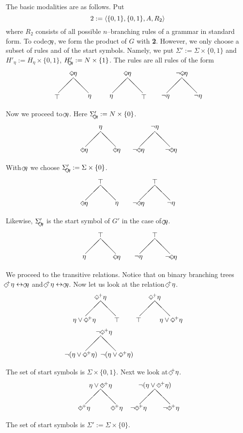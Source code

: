 The basic modalities are as follows. Put
\begin{equation}
\boldmath{2} := \langle \{0,1\}, \{0,1\}, A, R_2\rangle
\end{equation}
where $R_2$ consists of all possible $n$--branching rules of a 
grammar in standard form. To code $\unten \eta$, we form the 
product of $G$ with \textbf{2}. However, we only choose a subset 
of rules and of the start symbols. Namely, we put $\Sigma' := 
\Sigma \times \{0,1\}$ and $H'_{\eta} := H_{\eta} \times \{0,1\}$, 
$H'_{\unten \eta} := N \times \{1\}$. The rules are all rules 
of the form
\begin{equation}
\begin{array}{l}
\binbaum{\unten \eta}{\top}{\eta}
\binbaum{\unten \eta}{\eta}{\top}
\binbaum{\nicht\unten \eta}{\nicht\eta}{\nicht\eta}
\end{array}
\end{equation}
Now we proceed to $\oben\eta$. Here $\Sigma'_{\oben\eta}
:= N \times \{0\}$.
\begin{equation}
\begin{array}{l}
\binbaum{\eta}{\oben \eta}{\oben \eta}
\binbaum{\nicht\eta}{\nicht\oben\eta}{\nicht\oben\eta}
\end{array}
\end{equation}
With $\rechts\eta$ we choose $\Sigma'_{\rechts\eta} := \Sigma \times
\{0\}$.
\begin{equation}
\begin{array}{l}
\binbaum{\top}{\rechts\eta}{\eta}
\binbaum{\top}{\nicht\rechts \eta}{\nicht \eta}
\end{array}
\end{equation}
Likewise, $\Sigma'_{\links\eta}$ is the start symbol of
$G'$ in the case of $\links\eta$.
\begin{equation}
\begin{array}{l}
\binbaum{\top}{\eta}{\links\eta}
\binbaum{\top}{\nicht\eta}{\nicht \links \eta}
\end{array}
\end{equation}
We proceed to the transitive relations. Notice that on binary 
branching trees $\rechts^+ \eta \dpf \rechts \eta$ and 
$\links^+ \eta \dpf \links \eta$. Now let us look at the 
relation $\unten^+\eta$.
\begin{equation}
\begin{array}{l}
\binbaum{\unten^+ \eta}{\eta \oder \unten^+ \eta}{\top}
\binbaum{\unten^+ \eta}{\top}{\eta \oder \unten^+ \eta} \\
\binbaum{\quad\nicht\unten^+ \eta}{\nicht (\eta \oder \unten^+ \eta)\quad}%
{\nicht (\eta \oder \unten^+ \eta)}
\end{array}
\end{equation}
The set of start symbols is $\Sigma \times \{0,1\}$.
Next we look at $\oben^+ \eta$.
\begin{equation}
\begin{array}{l}
\binbaum{\eta\oder\oben^+ \eta}{\oben^+ \eta}{\oben^+\eta}
\binbaum{\nicht (\eta \oder \oben^+ \eta)}{\nicht\oben^+ %
\eta}{\nicht \oben^+\eta}
\end{array}
\end{equation}
The set of start symbols is $\Sigma' := \Sigma \times \{0\}$.

